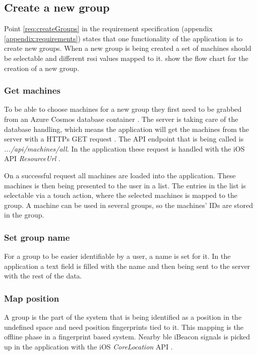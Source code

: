 \subsection{Create a new group}\label{sec:implAppNewGroup}

Point \ref{req:createGroups} in the requirement specification (appendix \ref{appendix:requirements}) states that one functionality of the application is to create new groups.
When a new group is being created a set of machines should be selectable and different \acrfull{rssi} values mapped to it.
 show the flow chart for the creation of a new group.


\subsubsection{Get machines}\label{sec:implAppNewGroupGetMachines}
To be able to choose machines for a new group they first need to be grabbed from an Azure Cosmos database container \cite{IntroductionAzureCosmos}.
The server is taking care of the database handling, which means the application will get the machines from the server with a HTTPs GET request \cite{GETHTTPMDN}.
The API endpoint that is being called is \textit{.../api/machines/all}.
In the application these request is handled with the iOS API \textit{ResourceUrl} \cite{ResourceURLAppleDeveloper}.

\bigskip

On a successful request all machines are loaded into the application.
These machines is then being presented to the user in a list.
The entries in the list is selectable via a touch action, where the selected machines is mapped to the group.
A machine can be used in several groups, so the machines' IDs are stored in the group. 

\subsubsection{Set group name}\label{sec:implAppNewGroupSetName}
For a group to be easier identifiable by a user, a name is set for it.
In the application a text field is filled with the name and then being sent to the server with the rest of the data.


\subsubsection{Map position}\label{sec:implAppNewGroupMapPos}
A group is the part of the system that is being identified as a position in the undefined space and need position fingerprints tied to it.
This mapping is the offline phase in a fingerprint based system.
Nearby \acrfull{ble} iBeacon signals is picked up in the application with the iOS \textit{CoreLocation} API \cite{CoreLocationApple}.


